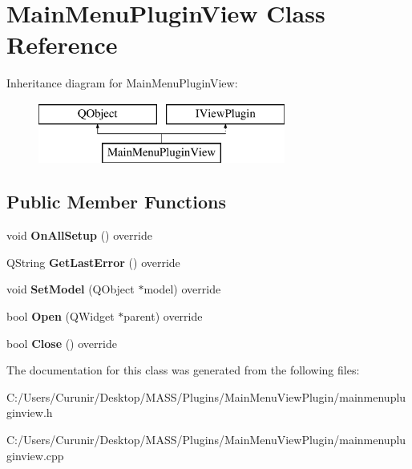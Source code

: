 \hypertarget{class_main_menu_plugin_view}{}\section{Main\+Menu\+Plugin\+View Class Reference}
\label{class_main_menu_plugin_view}
Inheritance diagram for Main\+Menu\+Plugin\+View\+:\begin{figure}[H]
\begin{center}
\leavevmode
\includegraphics[height=2.000000cm]{class_main_menu_plugin_view}
\end{center}
\end{figure}
\subsection*{Public Member Functions}
\begin{DoxyCompactItemize}
\item 
\mbox{\label{class_main_menu_plugin_view_a898a8bd2689bb67c269784ea61c46f28}} 
void {\bfseries On\+All\+Setup} () override
\item 
\mbox{\label{class_main_menu_plugin_view_a8ac24e47204a97d5e3bbf616d6baf8bd}} 
Q\+String {\bfseries Get\+Last\+Error} () override
\item 
\mbox{\label{class_main_menu_plugin_view_aad01cbc42d5dc1313df945e80b24f30a}} 
void {\bfseries Set\+Model} (Q\+Object $\ast$model) override
\item 
\mbox{\label{class_main_menu_plugin_view_acf1a0711a5b95bf67598aa4458916a4f}} 
bool {\bfseries Open} (Q\+Widget $\ast$parent) override
\item 
\mbox{\label{class_main_menu_plugin_view_aa269aebba786a16087a97cb350077c36}} 
bool {\bfseries Close} () override
\end{DoxyCompactItemize}


The documentation for this class was generated from the following files\+:\begin{DoxyCompactItemize}
\item 
C\+:/\+Users/\+Curunir/\+Desktop/\+M\+A\+S\+S/\+Plugins/\+Main\+Menu\+View\+Plugin/mainmenupluginview.\+h\item 
C\+:/\+Users/\+Curunir/\+Desktop/\+M\+A\+S\+S/\+Plugins/\+Main\+Menu\+View\+Plugin/mainmenupluginview.\+cpp\end{DoxyCompactItemize}
